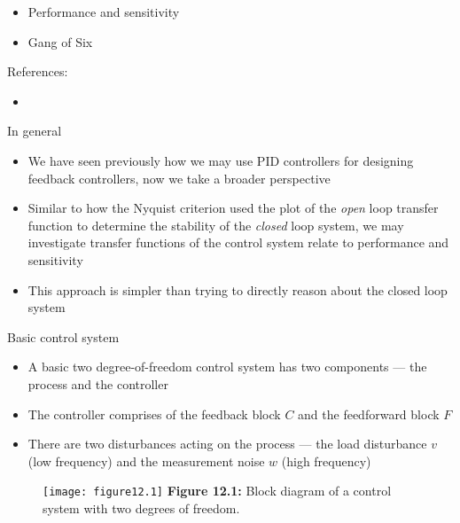 \documentclass{beamer-control}
\begin{document}

\begin{SUMMARY}
\begin{itemize}
\item Performance and sensitivity
\item Gang of Six
\end{itemize}
\vfill References:
\begin{itemize}
\item {}
\end{itemize}
\end{SUMMARY}




\begin{frame}{In general}
\begin{itemize}
\item We have seen previously how we may use PID controllers for designing feedback controllers, now we take a broader perspective
\item Similar to how the Nyquist criterion used the plot of the \textit{open} loop transfer function to determine the stability of the \textit{closed} loop system, we may investigate transfer functions of the control system relate to performance and sensitivity
\item This approach is simpler than trying to directly reason about the closed loop system
\end{itemize}
\end{frame}


\begin{frame}{Basic control system}
\begin{itemize}
	\item A basic two degree-of-freedom control system has two components --- the process and the controller
	\item The controller comprises of the feedback block $C$ and the feedforward block $F$
	\item There are two disturbances acting on the process --- the load disturbance $v$ (low frequency) and the measurement noise $w$ (high frequency)
\end{itemize}

\begin{figure}
	\centering
	\vspace{-0.5cm}
	\texttt{[image: figure12.1]}
	\textbf{Figure 12.1:} Block diagram of a control system with two degrees of freedom.
\end{figure}
\end{frame}
\end{document}
